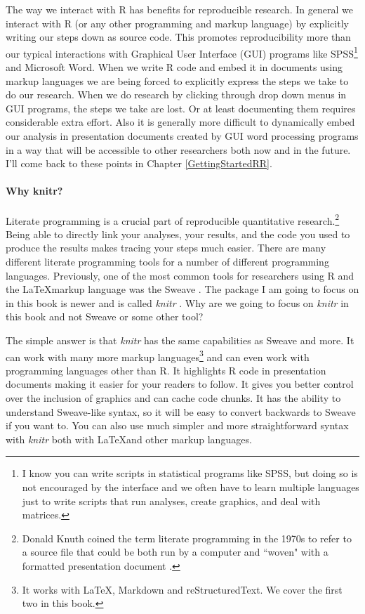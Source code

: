 The way we interact with R has benefits for reproducible research. In general we interact with R (or any other programming and markup language) by explicitly writing our steps down as source code. This promotes reproducibility more than our typical interactions with Graphical User Interface (GUI) programs like SPSS\footnote{I know you can write scripts in statistical programs like SPSS, but doing so is not encouraged by the interface and we often have to learn multiple languages just to write scripts that run analyses, create graphics, and deal with matrices.} and Microsoft Word. When we write R code and embed it in documents using markup languages we are being forced to explicitly express the steps we take to do our research. When we do research by clicking through drop down menus in GUI programs, the steps we take are lost. Or at least documenting them requires considerable extra effort. Also it is generally more difficult to dynamically embed our analysis in presentation documents created by GUI word processing programs in a way that will be accessible to other researchers both now and in the future. I'll come back to these points in Chapter \ref{GettingStartedRR}.

\paragraph{Why knitr?}

Literate programming is a crucial part of reproducible quantitative research.\footnote{Donald Knuth coined the term literate programming in the 1970s to refer to a source file that could be both run by a computer and ``woven" with a formatted presentation document \cite[]{Knuth1992}.} Being able to directly link your analyses, your results, and the code you used to produce the results makes tracing your steps much easier. There are many different literate programming tools for a number of different programming languages. Previously, one of the most common tools for researchers using R and the \LaTeX markup language was the Sweave \cite[]{Leisch2002}. The package I am going to focus on in this book is newer and is called {\emph{knitr}} \cite[]{knitr}. Why are we going to focus on {\emph{knitr}} in this book and not Sweave or some other tool?

The simple answer is that {\emph{knitr}} has the same capabilities as Sweave and more. It can work with many more markup languages\footnote{It works with \LaTeX, Markdown and reStructuredText. We cover the first two in this book.} and can even work with programming languages other than R. It highlights R code in presentation documents making it easier for your readers to follow. It gives you better control over the inclusion of graphics and can cache code chunks. It has the ability to understand Sweave-like syntax, so it will be easy to convert backwards to Sweave if you want to. You can also use much simpler and more straightforward syntax with {\emph{knitr}} both with \LaTeX and other markup languages. 

